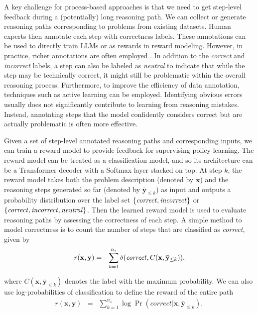 A key challenge for process-based approaches is that we need to get step-level feedback during a (potentially) long reasoning path. We can collect or generate reasoning paths corresponding to problems from existing datasets. Human experts then annotate each step with correctness labels. These annotations can be used to directly train LLMs or as rewards in reward modeling. However, in practice, richer annotations are often employed \cite{lightman-etal:2024lets}. In addition to the \textit{correct} and \textit{incorrect} labels, a step can also be labeled as \textit{neutral} to indicate that while the step may be technically correct, it might still be problematic within the overall reasoning process. Furthermore, to improve the efficiency of data annotation, techniques such as active learning can be employed. Identifying obvious errors usually does not significantly contribute to learning from reasoning mistakes. Instead, annotating steps that the model confidently considers correct but are actually problematic is often more effective.

Given a set of step-level annotated reasoning paths and corresponding inputs, we can train a reward model to provide feedback for supervising policy learning. The reward model can be treated as a classification model, and so its architecture can be a Transformer decoder with a Softmax layer stacked on top. At step $k$, the reward model takes both the problem description (denoted by $\mathbf{x}$) and the reasoning steps generated so far (denoted by $\bar{\mathbf{y}}_{\le k}$) as input and outputs a probability distribution over the label set $\{\text{\textit{correct}}, \text{\textit{incorrect}}\}$ or $\{\text{\textit{correct}}, \text{\textit{incorrect}}, \text{\textit{neutral}}\}$. Then the learned reward model is used to evaluate reasoning paths by assessing the correctness of each step. A simple method to model correctness is to count the number of steps that are classified as \textit{correct}, given by
\begin{eqnarray}
r(\mathbf{x},\mathbf{y}) & = & \sum_{k=1}^{n_s} \delta(\text{\textit{correct}},C(\mathbf{x},\bar{\mathbf{y}}_{\le k})),
\end{eqnarray}

\noindent where $C(\mathbf{x},\bar{\mathbf{y}}_{\le k})$ denotes the label with the maximum probability. We can also use log-probabilities of classification to define the reward of the entire path
\begin{eqnarray}
r(\mathbf{x},\mathbf{y}) & = &  \sum_{k=1}^{n_s} \log \Pr(\textit{correct}|\mathbf{x},\bar{\mathbf{y}}_{\le k}),
\end{eqnarray}


